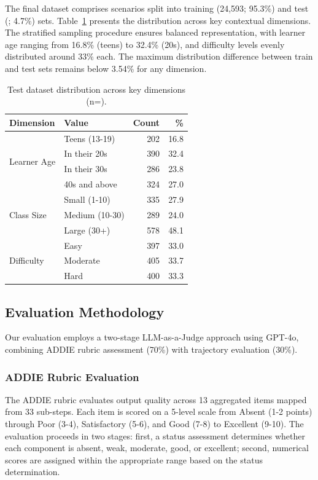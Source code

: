 The final dataset comprises \numscenarios{} scenarios split into training (24,593; 95.3\%) and test (\numtest{}; 4.7\%) sets. Table~\ref{tab:dataset-distribution} presents the distribution across key contextual dimensions. The stratified sampling procedure ensures balanced representation, with learner age ranging from 16.8\% (teens) to 32.4\% (20s), and difficulty levels evenly distributed around 33\% each. The maximum distribution difference between train and test sets remains below 3.54\% for any dimension.

\begin{table}[t]
\centering
\small
\caption{Test dataset distribution across key dimensions (n=\numtest{}).}
\label{tab:dataset-distribution}
\begin{tabular}{llrr}
\toprule
\textbf{Dimension} & \textbf{Value} & \textbf{Count} & \textbf{\%} \\
\midrule
\multirow{4}{*}{Learner Age}
    & Teens (13-19) & 202 & 16.8 \\
    & In their 20s & 390 & 32.4 \\
    & In their 30s & 286 & 23.8 \\
    & 40s and above & 324 & 27.0 \\
\midrule
\multirow{3}{*}{Class Size}
    & Small (1-10) & 335 & 27.9 \\
    & Medium (10-30) & 289 & 24.0 \\
    & Large (30+) & 578 & 48.1 \\
\midrule
\multirow{3}{*}{Difficulty}
    & Easy & 397 & 33.0 \\
    & Moderate & 405 & 33.7 \\
    & Hard & 400 & 33.3 \\
\bottomrule
\end{tabular}
\end{table}

\subsection{Evaluation Methodology}
\label{subsec:evaluation}

Our evaluation employs a two-stage LLM-as-a-Judge approach using GPT-4o, combining ADDIE rubric assessment (70\%) with trajectory evaluation (30\%).

\subsubsection{ADDIE Rubric Evaluation}
The ADDIE rubric evaluates output quality across 13 aggregated items mapped from 33 sub-steps. Each item is scored on a 5-level scale from Absent (1-2 points) through Poor (3-4), Satisfactory (5-6), and Good (7-8) to Excellent (9-10). The evaluation proceeds in two stages: first, a status assessment determines whether each component is absent, weak, moderate, good, or excellent; second, numerical scores are assigned within the appropriate range based on the status determination.

